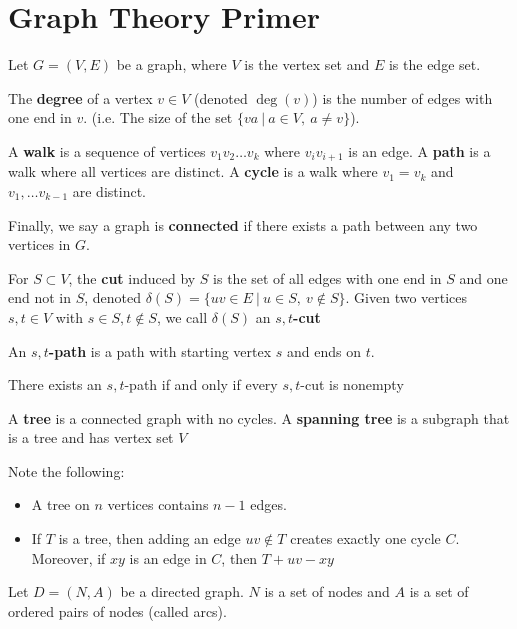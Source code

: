 \documentclass[../co351.tex]{subfiles}
\begin{document}
\section{Graph Theory Primer}
Let $G = (V, E)$ be a graph, where $V$ is the vertex set and $E$ is the edge set.
\begin{definition}{}{}
   The \textbf{degree} of a vertex $v \in V$ (denoted $\deg(v)$) is the number of edges with one end in $v$. (i.e. The size of the set $\{ va \:\rvert\: a \in V, \ a \neq v \}$).

   A \textbf{walk} is a sequence of vertices $v_1v_2\ldots v_k$ where $v_iv_{i+1}$ is an edge. A \textbf{path} is a walk where all vertices are distinct. A \textbf{cycle} is a walk where $v_1 = v_k$ and $v_1, \ldots v_{k-1}$ are distinct.

   Finally, we say a graph is \textbf{connected} if there exists a path between any two vertices in $G$.
\end{definition}

\begin{definition}{}{}
  For $S \subset V$, the \textbf{cut} induced by $S$ is the set of all edges with one end in $S$ and one end not in $S$, denoted $\delta(S) = \{uv \in E \:\rvert\: u \in S, \ v \not\in S \}$. Given two vertices $s, t \in V$ with $s \in S, t \not\in S$, we call $\delta(S)$ an \textbf{$s,t$-cut}

  An \textbf{$s,t$-path} is a path with starting vertex $s$ and ends on $t$.
\end{definition}

\begin{theorem}{}{}
  There exists an $s,t$-path if and only if every $s,t$-cut is nonempty
\end{theorem}

\begin{definition}{}{}
  A \textbf{tree} is a connected graph with no cycles. A \textbf{spanning tree} is a subgraph that is a tree and has vertex set $V$
\end{definition}
Note the following:
\begin{itemize}
  \item A tree on $n$ vertices contains $n-1$ edges.
  \item If $T$ is a tree, then adding an edge $uv \not\in T$ creates exactly one cycle $C$. Moreover, if $xy$ is an edge in $C$, then $T + uv - xy$
\end{itemize}

Let $D = (N, A)$ be a directed graph. $N$ is a set of nodes and $A$ is a set of ordered pairs of nodes (called arcs).
\end{document}
